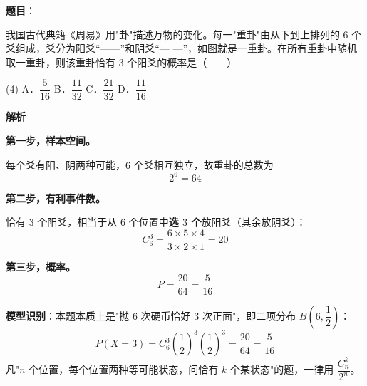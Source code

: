 \begin{answer}

\textbf{题目}：

我国古代典籍《周易》用"卦"描述万物的变化。每一"重卦"由从下到上排列的 $6$ 个爻组成，爻分为阳爻“——”和阴爻“— —”，如图就是一重卦。在所有重卦中随机取一重卦，则该重卦恰有 $3$ 个阳爻的概率是\mbox{（　　）}

\begin{gkopts}(4)
\task A．$\dfrac5{16}$
\task B．$\dfrac{11}{32}$
\task C．$\dfrac{21}{32}$
\task D．$\dfrac{11}{16}$
\end{gkopts}

\textbf{解析}

\textbf{第一步，样本空间。}

每个爻有阳、阴两种可能，$6$ 个爻相互独立，故重卦的总数为
\nopagebreak[4]
\[2^{6}=64\]

\textbf{第二步，有利事件数。}

恰有 $3$ 个阳爻，相当于从 $6$ 个位置中\textbf{选 $3$ 个}放阳爻（其余放阴爻）：
\nopagebreak[4]
\[C_6^{3}=\frac{6\times5\times4}{3\times2\times1}=20\]

\textbf{第三步，概率。}
\nopagebreak[4]
\[P=\frac{20}{64}=\frac5{16}\]

\begin{gktip}
\textbf{模型识别}：本题本质上是"抛 $6$ 次硬币恰好 $3$ 次正面"，即二项分布 $B\left(6,\dfrac12\right)$：
\nopagebreak[4]
\[P(X=3)=C_6^{3}\left(\frac12\right)^{3}\left(\frac12\right)^{3}=\frac{20}{64}=\frac5{16}\]
凡"$n$ 个位置，每个位置两种等可能状态，问恰有 $k$ 个某状态"的题，一律用 $\dfrac{C_n^{k}}{2^{n}}$。
\end{gktip}


\par\medskip

\end{answer}
